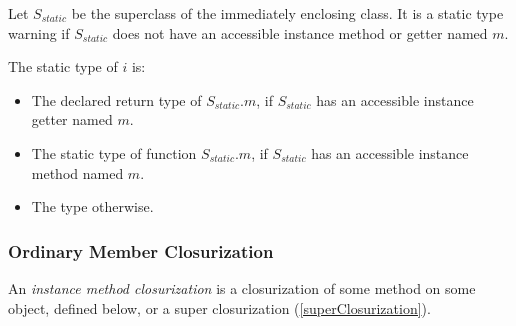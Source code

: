\documentclass{article}
\begin{document}
\LMHash{}
Let $S_{static}$ be the superclass of the immediately enclosing class.
It is a static type warning if $S_{static}$ does not have an accessible instance method or getter named $m$.

The static type of $i$ is:
\begin{itemize}
\item The declared return type of $S_{static}.m$, if $S_{static}$ has an accessible instance getter named $m$.
\item The static type of function $S_{static}.m$, if $S_{static}$ has an accessible instance method named $m$.
\item The type \DYNAMIC{} otherwise.
\end{itemize}


\subsubsection{Ordinary Member Closurization}


\LMHash{}
An {\em instance method closurization}
is a closurization of some method on some object, defined below,
or a super closurization (\ref{superClosurization}).
\end{document}

